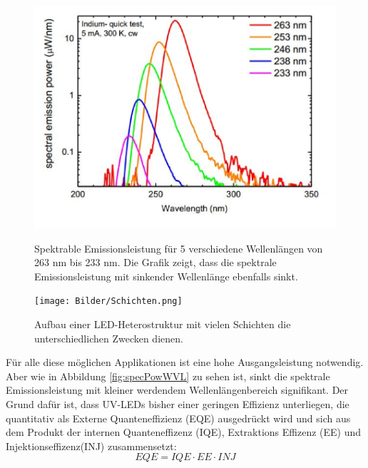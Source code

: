 \begin{figure}[htb]
    \centering
    \begin{minipage}[t]{0.49\linewidth}
        \centering
        \includegraphics[width=\linewidth]{Bilder/SpectralEmissionPower_Wavelength.png}
        \caption{Spektrable Emissionsleistung für 5 verschiedene Wellenlängen von 263 nm bis 233 nm. Die Grafik zeigt, dass die spektrale Emissionsleistung mit sinkender Wellenlänge ebenfalls sinkt\cite{semreich}.}
        \label{fig:specPowWVL}
    \end{minipage}
    \hfill
    \begin{minipage}[t]{0.49\linewidth}
        \centering
        \texttt{[image: Bilder/Schichten.png]}
        \caption{Aufbau einer LED-Heterostruktur mit vielen Schichten die unterschiedlichen Zwecken dienen.}
        \label{fig:schichtenLED}
    \end{minipage}
\end{figure}
\noindent
%
Für alle diese möglichen Applikationen ist eine hohe Ausgangsleistung notwendig. Aber wie in Abbildung \ref{fig:specPowWVL} zu sehen ist, sinkt die spektrale Emissionsleistung mit kleiner werdendem Wellenlängenbereich signifikant. Der Grund dafür ist, dass UV-LEDs bisher einer geringen Effizienz unterliegen, die quantitativ als Externe Quanteneffizienz (EQE) ausgedrückt wird und sich aus dem Produkt der internen Quanteneffizenz (IQE), Extraktions Effizenz (EE) und Injektionseffizenz(INJ) zusammensetzt:
%
\begin{equation}
    EQE = IQE \cdot EE \cdot INJ
\end{equation}
%
